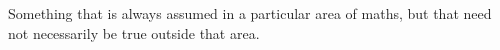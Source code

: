 Something that is always assumed in a particular area of
maths, but that need not necessarily be true outside
that area.